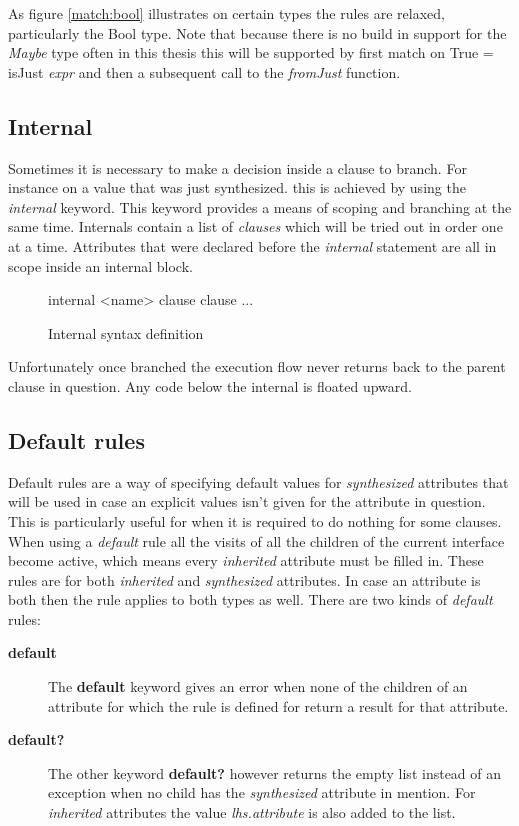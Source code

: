 As figure \ref{match:bool} illustrates on certain types the rules are relaxed, particularly the Bool type. Note that because there is no build in support for the \emph{Maybe} type often in this thesis this will be supported by first match on True = isJust \emph{expr} and then a subsequent call to the \emph{fromJust} function.
\subsection{Internal}
Sometimes it is necessary to make a decision inside a clause to branch. For instance on a value that was just synthesized. this is achieved by using the \emph{internal} keyword. This keyword provides a means of scoping and branching at the same time. Internals contain a list of \emph{clauses} which will be tried out in order one at a time. Attributes that were declared before the \emph{internal} statement are all in scope inside an internal block. 

\begin{figure}[h!]
\begin{code}
internal <name>
  {clause}
  {clause}
  ...
\end{code}
\caption{Internal syntax definition}
\label{internal:syntax}
\end{figure}

Unfortunately once branched the execution flow never returns back to the parent clause in question. Any code below the internal is floated upward.

\subsection{Default rules}
Default rules are a way of specifying default values for \emph{synthesized} attributes that will be used in case an explicit values isn't given for the attribute in question. This is particularly useful for when it is required to do nothing for some clauses.
When using a \emph{default} rule all the visits of all the children of the current interface become active, which means every \emph{inherited} attribute must be filled in.
These rules are for both \emph{inherited} and \emph{synthesized} attributes. In case an attribute is both then the rule applies to both types as well. There are two kinds of \emph{default} rules:
\begin{description}
\item[\textbf{default}] { The \textbf{default} keyword gives an error when none of the children of an attribute for which the rule is defined for return a result for that attribute. }
\item[\textbf{default?}] { The other keyword \textbf{default?} however returns the empty list instead of an exception when no child has the \emph{synthesized} attribute in mention. For \emph{inherited} attributes the value \emph{lhs.attribute} is also added to the list. }
\end{description}

